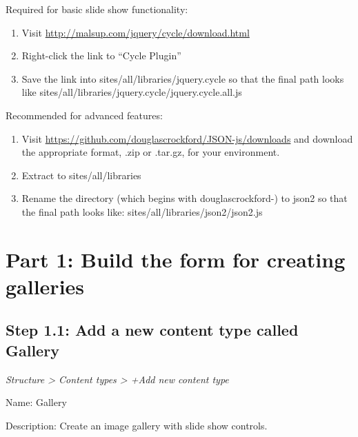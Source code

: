 \documentclass[letterpaper,10pt,english]{sphinxmanual}
\begin{document}
Required for basic slide show functionality:
\begin{enumerate}
\item {} 
Visit \href{http://malsup.com/jquery/cycle/download.html}{http://malsup.com/jquery/cycle/download.html}

\item {} 
Right-click the link to “Cycle Plugin”

\item {} 
Save the link into sites/all/libraries/jquery.cycle so that the final path looks like sites/all/libraries/jquery.cycle/jquery.cycle.all.js

\end{enumerate}

Recommended for advanced features:
\begin{enumerate}
\item {} 
Visit \href{https://github.com/douglascrockford/JSON-js/downloads}{https://github.com/douglascrockford/JSON-js/downloads} and download the appropriate format, .zip or .tar.gz, for your environment.

\item {} 
Extract to sites/all/libraries

\item {} 
Rename the directory (which begins with douglascrockford-) to json2 so that the final path looks like: sites/all/libraries/json2/json2.js

\end{enumerate}


\section{Part 1: Build the form for creating galleries}
\label{recipe:part-1-build-the-form-for-creating-galleries}

\subsection{Step 1.1: Add a new content type called Gallery}
\label{recipe:step-1-1-add-a-new-content-type-called-gallery}
\emph{Structure \textgreater{} Content types \textgreater{} +Add new content type}

Name: Gallery

Description: Create an image gallery with slide show controls.
\end{document}
